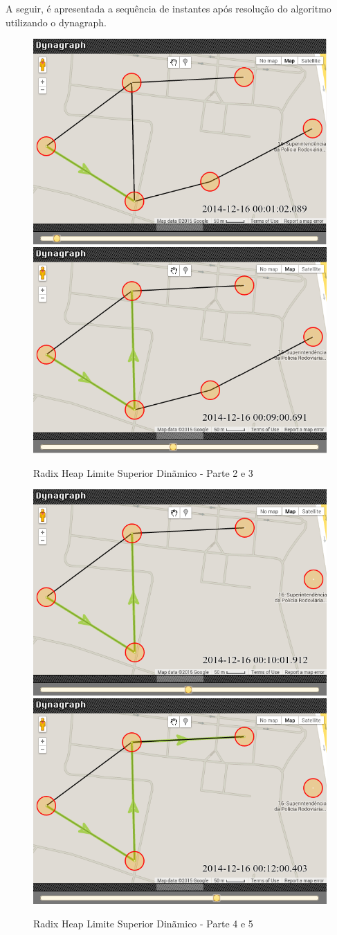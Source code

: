 A seguir, é apresentada a sequência de instantes após resolução do algoritmo utilizando o dynagraph.

\begin{figure}[htbp]
\centering
 \includegraphics[width=.45\textwidth]{chapters/fig/dyndyn2.png}
 \includegraphics[width=.45\textwidth]{chapters/fig/dyndyn3.png}
\caption{Radix Heap Limite Superior Dinãmico - Parte 2 e 3}
\label{fig:dyndyn2}
\end{figure}
\FloatBarrier

\begin{figure}[htbp]
\centering
 \includegraphics[width=.45\textwidth]{chapters/fig/dyndyn4.png}
 \includegraphics[width=.45\textwidth]{chapters/fig/dyndyn5.png}
\caption{Radix Heap Limite Superior Dinãmico - Parte 4 e 5}
\label{fig:dyndyn3}
\end{figure}
\FloatBarrier

